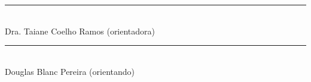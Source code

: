 \documentclass[12pt]{article}
\begin{document}
\vspace{4cm}

\begin{center}
    \begin{minipage}{0.6\textwidth}
        \centering
        \rule{\linewidth}{0.4pt} \\
        Dra. Taiane Coelho Ramos (orientadora)
    \end{minipage}
\end{center}

\vspace{4cm}

\begin{center}
    \begin{minipage}{0.6\textwidth}
        \centering
        \rule{\linewidth}{0.4pt} \\
        Douglas Blanc Pereira (orientando)
    \end{minipage}
\end{center}
\end{document}

